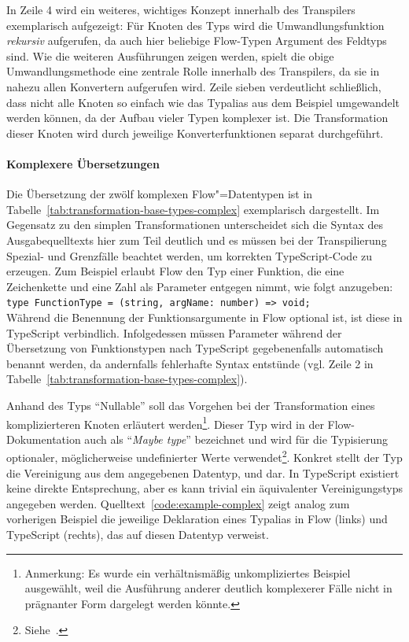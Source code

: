 In Zeile 4 wird ein weiteres, wichtiges Konzept innerhalb des Transpilers exemplarisch aufgezeigt: Für Knoten des Typs  wird die Umwandlungsfunktion \emph{rekursiv} aufgerufen, da auch hier beliebige Flow-Typen Argument des Feldtyps sind. Wie die weiteren Ausführungen zeigen werden, spielt die obige Umwandlungsmethode eine zentrale Rolle innerhalb des Transpilers, da sie in nahezu allen Konvertern aufgerufen wird. Zeile sieben verdeutlicht schließlich, dass nicht alle Knoten so einfach wie das Typalias aus dem Beispiel umgewandelt werden können, da der Aufbau vieler Typen komplexer ist. Die Transformation dieser Knoten wird durch jeweilige Konverterfunktionen separat durchgeführt.

\paragraph{Komplexere Übersetzungen}

Die Übersetzung der zwölf komplexen Flow"=Datentypen ist in Tabelle~\ref{tab:transformation-base-types-complex} exemplarisch dargestellt. Im Gegensatz zu den simplen Transformationen unterscheidet sich die Syntax des Ausgabequelltexts hier zum Teil deutlich und es müssen bei der Transpilierung Spezial- und Grenzfälle beachtet werden, um korrekten TypeScript-Code zu erzeugen. Zum Beispiel erlaubt Flow den Typ einer Funktion, die eine Zeichenkette und eine Zahl als Parameter entgegen nimmt, wie folgt anzugeben:
\\[.5\baselineskip]
{\small\texttt{type FunctionType = (string, argName: number) => void;}}
\\[.5\baselineskip]
Während die Benennung der Funktionsargumente in Flow optional ist, ist diese in TypeScript verbindlich. Infolgedessen müssen Parameter während der Übersetzung von Funktionstypen nach TypeScript gegebenenfalls automatisch benannt werden, da andernfalls fehlerhafte Syntax entstünde (vgl. Zeile 2 in Tabelle~\ref{tab:transformation-base-types-complex}).

\bigbreak


Anhand des Typs \enquote{Nullable} soll das Vorgehen bei der Transformation eines komplizierteren Knoten erläutert werden\footnote{Anmerkung: Es wurde ein verhältnismäßig unkompliziertes Beispiel ausgewählt, weil die Ausführung anderer deutlich komplexerer Fälle nicht in prägnanter Form dargelegt werden könnte.}. Dieser Typ wird in der Flow-Dokumentation auch als \enquote{\textit{Maybe type}} bezeichnet und wird für die Typisierung optionaler, möglicherweise undefinierter Werte verwendet\footnote{Siehe~\autocite[Maybe Types]{FLOW:TYPE_ANNOTATIONS}.}. Konkret stellt der Typ die Vereinigung aus dem angegebenen Datentyp,  und  dar. In TypeScript existiert keine direkte Entsprechung, aber es kann trivial ein äquivalenter Vereinigungstyps angegeben werden. Quelltext~\ref{code:example-complex} zeigt analog zum vorherigen Beispiel die jeweilige Deklaration eines Typalias in Flow (links) und TypeScript (rechts), das auf diesen Datentyp verweist.

